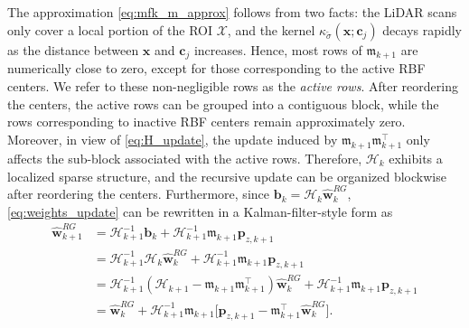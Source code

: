 \documentclass[journal,twoside,web]{ieeecolor}
\begin{document}
The approximation \eqref{eq:mfk_m_approx} follows from two facts: the LiDAR scans only cover a local portion of the ROI $\mathcal{X}$, and the kernel $\kappa_{\tilde\sigma}(\mathbf{x};\mathbf{c}_j)$ decays rapidly as the distance between $\mathbf{x}$ and $\mathbf{c}_j$ increases. Hence, most rows of $\mathfrak{m}_{k+1}$ are numerically close to zero, except for those corresponding to the active RBF centers. We refer to these non-negligible rows as the \emph{active rows}. After reordering the centers, the active rows can be grouped into a contiguous block, while the rows corresponding to inactive RBF centers remain approximately zero.
Moreover, in view of \eqref{eq:H_update}, the update induced by $\mathfrak{m}_{k+1}\mathfrak{m}_{k+1}^\top$ only affects the sub-block associated with the active rows. Therefore, $\bm{\mathcal{H}}_k$ exhibits a localized sparse structure, and the recursive update can be organized blockwise after reordering the centers. Furthermore, since $\mathbf{b}_k=\bm{\mathcal{H}}_k\hat{\mathbf{w}}_k^{RG}$, \eqref{eq:weights_update} can be rewritten in a Kalman-filter-style form as
\begin{align}
    \hat{\mathbf{w}}_{k+1}^{RG}
    &= \bm{\mathcal{H}}_{k+1}^{-1}\mathbf{b}_k+\bm{\mathcal{H}}_{k+1}^{-1}\mathfrak{m}_{k+1}\mathbf{p}_{z,k+1}\nonumber\\
    &= \bm{\mathcal{H}}_{k+1}^{-1}\bm{\mathcal{H}}_{k}\hat{\mathbf{w}}_k^{RG}+\bm{\mathcal{H}}_{k+1}^{-1}\mathfrak{m}_{k+1}\mathbf{p}_{z,k+1}\nonumber\\
    &= \bm{\mathcal{H}}_{k+1}^{-1}(\bm{\mathcal{H}}_{k+1}\!-\!\mathfrak{m}_{k+1}\mathfrak{m}_{k+1}^\top)\hat{\mathbf{w}}_k^{RG}
    \!+\!\bm{\mathcal{H}}_{k+1}^{-1}\mathfrak{m}_{k+1}\mathbf{p}_{z,k+1}\nonumber\\
    &= \hat{\mathbf{w}}_k^{RG}
    +\bm{\mathcal{H}}_{k+1}^{-1}\mathfrak{m}_{k+1}
    \bigl[\mathbf{p}_{z,k+1}-\mathfrak{m}_{k+1}^\top\hat{\mathbf{w}}_k^{RG}\bigr].
    \label{eq:kf_w_update}
\end{align}
\end{document}
